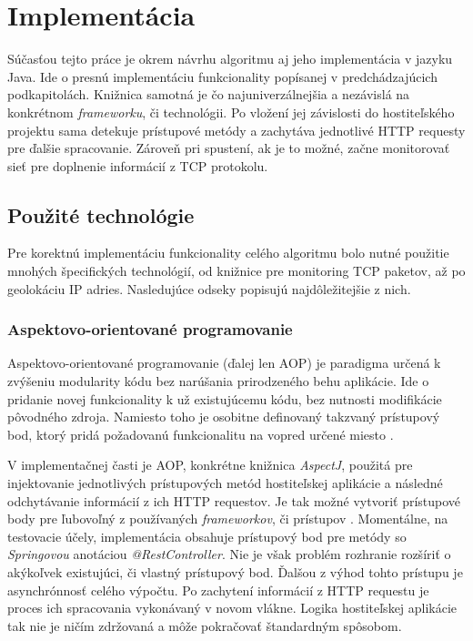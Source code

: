 \documentclass[
  printed, %
  table,   %
  lof,     %
  nolot,   %
  nocover
]{fithesis3}
\begin{document}
\section{Implementácia}
Súčasťou tejto práce je okrem návrhu algoritmu aj jeho implementácia v jazyku
Java. Ide o presnú implementáciu funkcionality popísanej v predchádzajúcich
podkapitolách. Knižnica samotná je čo najuniverzálnejšia a nezávislá na
konkrétnom \textit{frameworku}, či technológii. Po vložení jej závislosti do
hostiteľského projektu sama detekuje prístupové metódy a zachytáva jednotlivé
HTTP requesty pre ďalšie spracovanie. Zároveň pri spustení, ak je to možné,
začne monitorovať sieť pre doplnenie informácií z TCP protokolu.

\subsection{Použité technológie}
Pre korektnú implementáciu funkcionality celého algoritmu bolo nutné použitie
mnohých špecifických technológií, od knižnice pre monitoring TCP paketov, až po
geolokáciu IP adries. Nasledujúce odseky popisujú najdôležitejšie z nich.

\subsubsection{Aspektovo-orientované programovanie}
Aspektovo-orientované programovanie (ďalej len AOP) je paradigma určená k
zvýšeniu modularity kódu bez narúšania prirodzeného behu aplikácie. Ide o 
pridanie novej funkcionality k už existujúcemu kódu, bez nutnosti modifikácie
pôvodného zdroja. Namiesto toho je osobitne definovaný takzvaný prístupový bod,
ktorý pridá požadovanú funkcionalitu na vopred určené miesto \cite{Kiczales:1997:AOP}.

V implementačnej časti je AOP, konkrétne knižnica \textit{AspectJ}, použitá pre
injektovanie jednotlivých prístupových metód hostiteľskej aplikácie a následné
odchytávanie informácií z ich HTTP requestov. Je tak možné vytvoriť prístupové
body pre ľubovoľný z používaných \textit{frameworkov}, či prístupov \cite{Laddad:2009:AOP}. Momentálne, na
testovacie účely, implementácia obsahuje prístupový bod pre metódy so
\textit{Springovou} anotáciou \textit{@RestController}. Nie je však problém
rozhranie rozšíriť o akýkoľvek existujúci, či vlastný prístupový bod. Ďalšou z 
výhod tohto prístupu je asynchrónnosť celého výpočtu. Po zachytení informácií
z HTTP requestu je proces ich spracovania vykonávaný v novom vlákne. Logika
hostiteľskej aplikácie tak nie je ničím zdržovaná a môže pokračovať štandardným
spôsobom.
\end{document}

